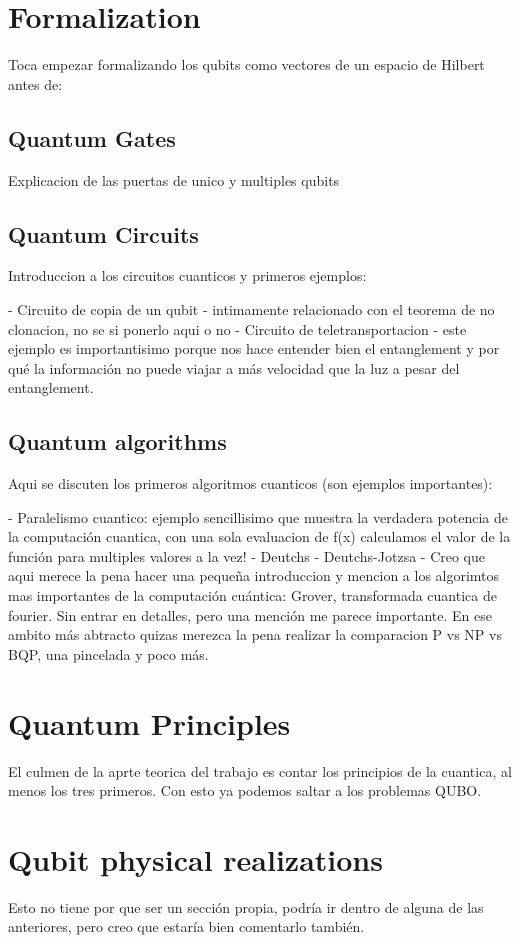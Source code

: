 	\section{Formalization }
	
	Toca empezar formalizando los qubits como vectores de un espacio de Hilbert antes de:
	
	
	\subsection{Quantum Gates}
	
	Explicacion de las puertas de unico y multiples qubits
	
	\subsection{Quantum Circuits}
	
	Introduccion a los circuitos cuanticos y primeros ejemplos:
	
	- Circuito de copia de un qubit - intimamente relacionado con el teorema de no clonacion, no se si ponerlo aqui o no
	- Circuito de teletransportacion - este ejemplo es importantisimo porque nos hace entender bien el entanglement y por qué la información no puede viajar a más velocidad que la luz a pesar del entanglement.
	
	\subsection{Quantum algorithms}
	
	Aqui se discuten los primeros algoritmos cuanticos (son ejemplos importantes):
	
	- Paralelismo cuantico: ejemplo sencillisimo que muestra la verdadera potencia de la computación cuantica, con una sola evaluacion de f(x) calculamos el valor de la función para multiples valores a la vez!
	- Deutchs
	- Deutchs-Jotzsa
	- Creo que aqui merece la pena hacer una pequeña introduccion y mencion a los algorimtos mas importantes de la computación cuántica: Grover, transformada cuantica de fourier. Sin entrar en detalles, pero una mención me parece importante. En ese ambito más abtracto quizas merezca la pena realizar la comparacion P vs NP vs BQP, una pincelada y poco más.
	
	
	\section{Quantum Principles}
	
	El culmen de la aprte teorica del trabajo es contar los principios de la cuantica, al menos los tres primeros. Con esto ya podemos saltar a los problemas QUBO.
	
	\section{Qubit physical realizations}
	
	Esto no tiene por que ser un sección propia, podría ir dentro de alguna de las anteriores, pero creo que estaría bien comentarlo también.
	


